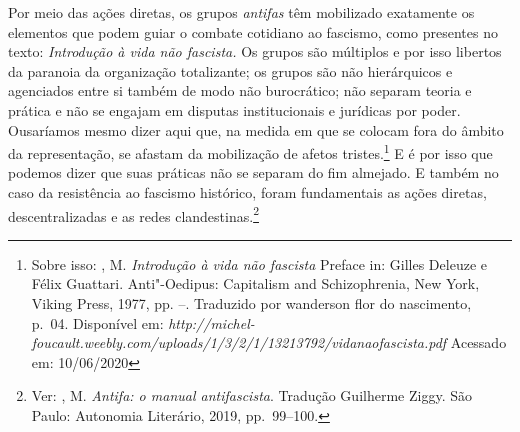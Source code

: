 Por meio das ações diretas, os grupos \emph{antifas} têm mobilizado
exatamente os elementos que podem guiar o combate cotidiano ao fascismo,
como presentes no texto: \emph{Introdução à vida não fascista.} Os
grupos são múltiplos e por isso libertos da paranoia da organização
totalizante; os grupos são não hierárquicos e agenciados entre si também
de modo não burocrático; não separam teoria e prática e não se engajam
em disputas institucionais e jurídicas por poder. Ousaríamos mesmo dizer
aqui que, na medida em que se colocam fora do âmbito da representação,
se afastam da mobilização de afetos tristes.\footnote{Sobre isso:
  , M. \emph{Introdução à vida não fascista} Preface in: Gilles
  Deleuze e Félix Guattari. Anti"-Oedipus: Capitalism and Schizophrenia,
  New York, Viking Press, 1977, pp. --. Traduzido por wanderson flor
  do nascimento, p.~04. Disponível em:
  \emph{http://michel-foucault.weebly.com/uploads/1/3/2/1/13213792/vidanaofascista.pdf}
  Acessado em: 10/06/2020} E é por isso que podemos dizer que suas
práticas não se separam do fim almejado. E também no caso da resistência
ao fascismo histórico, foram fundamentais as ações diretas,
descentralizadas e as redes clandestinas.\footnote{Ver: , M.
  \emph{Antifa: o manual antifascista}. Tradução Guilherme Ziggy. São
  Paulo: Autonomia Literário, 2019, pp.~99--100.}

